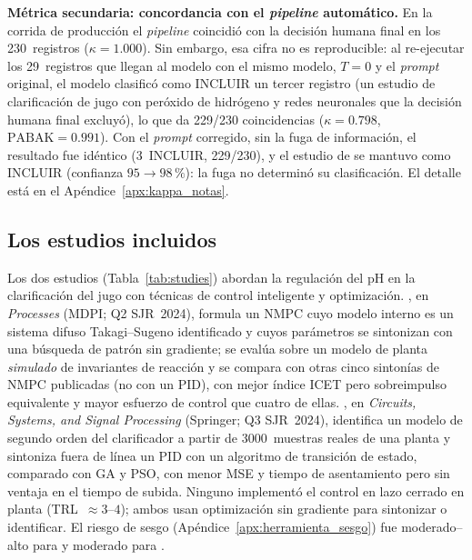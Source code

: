 \textbf{Métrica secundaria: concordancia con el \textit{pipeline}
automático.} En la corrida de producción el \textit{pipeline} coincidió
con la decisión humana final en los 230~registros ($\kappa=1.000$). Sin
embargo, esa cifra no es reproducible: al re-ejecutar los 29~registros
que llegan al modelo con el mismo modelo, $T=0$ y el \textit{prompt}
original, el modelo clasificó como INCLUIR un tercer registro (un estudio
de clarificación de jugo con peróxido de hidrógeno y redes neuronales que
la decisión humana final excluyó), lo
que da 229/230 coincidencias ($\kappa=0.798$, $\text{PABAK}=0.991$).
Con el \textit{prompt} corregido, sin la fuga de información, el
resultado fue idéntico (3~INCLUIR, 229/230), y el estudio de
\cite{palaciomorales2021optimiza} se mantuvo como INCLUIR (confianza
$95\to98\,\%$): la fuga no determinó su clasificación. El detalle está
en el Apéndice~\ref{apx:kappa_notas}.

\subsection{Los estudios incluidos}
\label{sub:res_estudio}

Los dos estudios (Tabla~\ref{tab:studies}) abordan la regulación del pH
en la clarificación del jugo con técnicas de control inteligente y
optimización. \cite{palaciomorales2021optimiza}, en \textit{Processes}
(MDPI; Q2 SJR~2024), formula un NMPC cuyo modelo interno es un sistema
difuso Takagi--Sugeno identificado y cuyos parámetros se sintonizan con
una búsqueda de patrón sin gradiente; se evalúa sobre un modelo de planta
\textit{simulado} de invariantes de reacción y se compara con otras cinco
sintonías de NMPC publicadas (no con un PID), con mejor índice ICET pero
sobreimpulso equivalente y mayor esfuerzo de control que cuatro de ellas.
\cite{murugesan2020computeraided}, en \textit{Circuits, Systems, and
Signal Processing} (Springer; Q3 SJR~2024), identifica un modelo de
segundo orden del clarificador a partir de 3000~muestras reales de una
planta y sintoniza fuera de línea un PID con un algoritmo de transición de
estado, comparado con GA y PSO, con menor MSE y tiempo de asentamiento
pero sin ventaja en el tiempo de subida. Ninguno implementó el control en
lazo cerrado en planta (TRL~$\approx 3$--$4$); ambos usan optimización
sin gradiente para sintonizar o identificar. El riesgo de sesgo
(Apéndice~\ref{apx:herramienta_sesgo}) fue moderado--alto para
\cite{palaciomorales2021optimiza} y moderado para
\cite{murugesan2020computeraided}.

